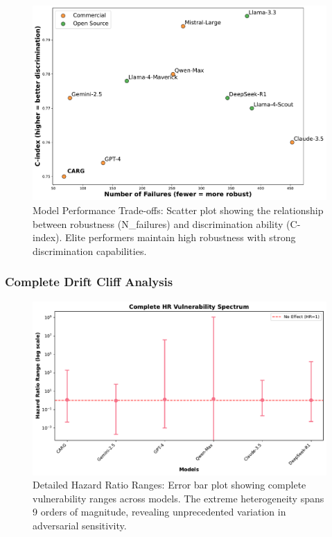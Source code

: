 \documentclass[letterpaper]{article}
\begin{document}
\begin{figure}[ht]
\centering
\includegraphics[width=\columnwidth]{figs/model_performance_comparison_2.pdf}
\caption{Model Performance Trade-offs: Scatter plot showing the relationship between robustness (N\_failures) and discrimination ability (C-index). Elite performers maintain high robustness with strong discrimination capabilities.}
\label{fig:performance_tradeoff_detailed}
\end{figure}

\subsubsection*{Complete Drift Cliff Analysis}

\begin{figure}[ht]
\centering
\includegraphics[width=\columnwidth]{figs/drift_cliff_phenomenon_2.pdf}
\caption{Detailed Hazard Ratio Ranges: Error bar plot showing complete vulnerability ranges across models. The extreme heterogeneity spans 9 orders of magnitude, revealing unprecedented variation in adversarial sensitivity.}
\label{fig:drift_cliff_ranges_detailed}
\end{figure}
\end{document}
